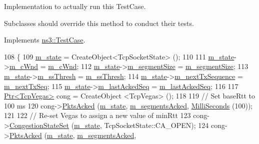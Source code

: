Implementation to actually run this Test\+Case. 

Subclasses should override this method to conduct their tests. 

Implements \hyperlink{classns3_1_1TestCase_a8ff74680cf017ed42011e4be51917a24}{ns3\+::\+Test\+Case}.


\begin{DoxyCode}
108 \{
109   \hyperlink{classTcpVegasTest_a6007fa2677ef19ffe1bdb192900a86b3}{m\_state} = CreateObject<TcpSocketState> ();
110 
111   \hyperlink{classTcpVegasTest_a6007fa2677ef19ffe1bdb192900a86b3}{m\_state}->\hyperlink{classns3_1_1TcpSocketState_a7cd3d2156a483c1db436097477a0fd7f}{m\_cWnd} = \hyperlink{classTcpVegasTest_a60f99e3ccb08c3ebfd7e7de6896ec2be}{m\_cWnd};
112   \hyperlink{classTcpVegasTest_a6007fa2677ef19ffe1bdb192900a86b3}{m\_state}->\hyperlink{classns3_1_1TcpSocketState_a079872f7b0099ef5f3cab4ff47bd2edd}{m\_segmentSize} = \hyperlink{classTcpVegasTest_a93c5780c0af6cdfa7af29c0a5688ca0a}{m\_segmentSize};
113   \hyperlink{classTcpVegasTest_a6007fa2677ef19ffe1bdb192900a86b3}{m\_state}->\hyperlink{classns3_1_1TcpSocketState_aec003b6dba9d269bfb1036c7652ffbd6}{m\_ssThresh} = \hyperlink{classTcpVegasTest_afee1db7a63768ef7cbf6641f2235c263}{m\_ssThresh};
114   \hyperlink{classTcpVegasTest_a6007fa2677ef19ffe1bdb192900a86b3}{m\_state}->\hyperlink{classns3_1_1TcpSocketState_ad1f77b1cbdb9267a89ebb6f16ac76892}{m\_nextTxSequence} = \hyperlink{classTcpVegasTest_a861be20b91b8b676667d33a15bc4632d}{m\_nextTxSeq};
115   \hyperlink{classTcpVegasTest_a6007fa2677ef19ffe1bdb192900a86b3}{m\_state}->\hyperlink{classns3_1_1TcpSocketState_a7a30ba2b675238429c7fe2f0c8d1ce94}{m\_lastAckedSeq} = \hyperlink{classTcpVegasTest_a46a6d79986d938af919528268e3fb99e}{m\_lastAckedSeq};
116 
117   \hyperlink{classns3_1_1Ptr}{Ptr<TcpVegas>} cong = CreateObject <TcpVegas> ();
118 
119   \textcolor{comment}{// Set baseRtt to 100 ms}
120   cong->\hyperlink{classns3_1_1TcpVegas_adb646411aad266d6db894b88f2baff0f}{PktsAcked} (\hyperlink{classTcpVegasTest_a6007fa2677ef19ffe1bdb192900a86b3}{m\_state}, \hyperlink{classTcpVegasTest_af429efbb9af0e86883c30c8177e1ee0e}{m\_segmentsAcked}, 
      \hyperlink{group__timecivil_gaf26127cf4571146b83a92ee18679c7a9}{MilliSeconds} (100));
121 
122   \textcolor{comment}{// Re-set Vegas to assign a new value of minRtt}
123   cong->\hyperlink{classns3_1_1TcpVegas_a0e82c50f7d326449fca838e46cbb9821}{CongestionStateSet} (\hyperlink{classTcpVegasTest_a6007fa2677ef19ffe1bdb192900a86b3}{m\_state}, TcpSocketState::CA\_OPEN);
124   cong->\hyperlink{classns3_1_1TcpVegas_adb646411aad266d6db894b88f2baff0f}{PktsAcked} (\hyperlink{classTcpVegasTest_a6007fa2677ef19ffe1bdb192900a86b3}{m\_state}, \hyperlink{classTcpVegasTest_af429efbb9af0e86883c30c8177e1ee0e}{m\_segmentsAcked}, 

\end{DoxyCode}
